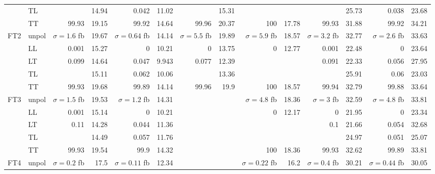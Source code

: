 \begin{table}[h]
{\begin{tabular}{llrrrrrrrrrrrr}
 & TL &  & \num{14.94} & \num{0.042} & \num{11.02} &  & \num{15.31} &  &  &  & \num{25.73} & \num{0.038} & \num{23.68} \\
 & TT & \num{99.93} & \num{19.15} & \num{99.92} & \num{14.64} & \num{99.96} & \num{20.37} & \num{100} & \num{17.78} & \num{99.93} & \num{31.88} & \num{99.92} & \num{34.21} \\
\midrule
\multirow{5}{*}{FT2}
 & unpol & $\sigma = \num{1.6}$ fb & \num{19.67} & $\sigma = \num{0.64}$ fb & \num{14.14} & $\sigma = \num{5.5}$ fb & \num{19.89} & $\sigma = \num{5.9}$ fb & \num{18.57} & $\sigma = \num{3.2}$ fb & \num{32.77} & $\sigma = \num{2.6}$ fb & \num{33.63} \\
 & LL & \num{0.001} & \num{15.27} & \num{0} & \num{10.21} & \num{0} & \num{13.75} & \num{0} & \num{12.77} & \num{0.001} & \num{22.48} & \num{0} & \num{23.64} \\
 & LT & \num{0.099} & \num{14.64} & \num{0.047} & \num{9.943} & \num{0.077} & \num{12.39} &  &  & \num{0.091} & \num{22.33} & \num{0.056} & \num{27.95} \\
 & TL &  & \num{15.11} & \num{0.062} & \num{10.06} &  & \num{13.36} &  &  &  & \num{25.91} & \num{0.06} & \num{23.03} \\
 & TT & \num{99.93} & \num{19.68} & \num{99.89} & \num{14.14} & \num{99.96} & \num{19.9} & \num{100} & \num{18.57} & \num{99.94} & \num{32.79} & \num{99.88} & \num{33.64} \\
\midrule
\multirow{5}{*}{FT3}
 & unpol & $\sigma = \num{1.5}$ fb & \num{19.53} & $\sigma = \num{1.2}$ fb & \num{14.31} &  &  & $\sigma = \num{4.8}$ fb & \num{18.36} & $\sigma = \num{3}$ fb & \num{32.59} & $\sigma = \num{4.8}$ fb & \num{33.81} \\
 & LL & \num{0.001} & \num{15.14} & \num{0} & \num{10.21} &  &  & \num{0} & \num{12.17} & \num{0} & \num{21.95} & \num{0} & \num{23.34} \\
 & LT & \num{0.11} & \num{14.28} & \num{0.044} & \num{11.36} &  &  &  &  & \num{0.1} & \num{21.66} & \num{0.054} & \num{32.68} \\
 & TL &  & \num{14.49} & \num{0.057} & \num{11.76} &  &  &  &  &  & \num{24.97} & \num{0.051} & \num{25.07} \\
 & TT & \num{99.93} & \num{19.54} & \num{99.9} & \num{14.32} &  &  & \num{100} & \num{18.36} & \num{99.93} & \num{32.62} & \num{99.89} & \num{33.81} \\
\midrule
\multirow{5}{*}{FT4}
 & unpol & $\sigma = \num{0.2}$ fb & \num{17.5} & $\sigma = \num{0.11}$ fb & \num{12.34} &  &  & $\sigma = \num{0.22}$ fb & \num{16.2} & $\sigma = \num{0.4}$ fb & \num{30.21} & $\sigma = \num{0.44}$ fb & \num{30.05} \\

\end{tabular}}
\end{table}
